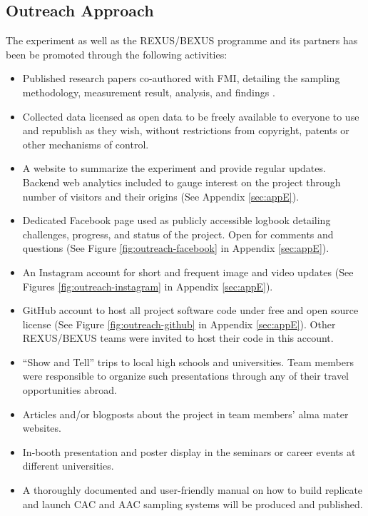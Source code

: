 
\subsection{Outreach Approach}

The experiment as well as the REXUS/BEXUS programme and its partners has been be promoted through the following activities:

\begin{itemize}
\item Published research papers co-authored with FMI, detailing the sampling methodology, measurement result, analysis, and findings \cite{esapac} \cite{labreche2020}.
\item Collected data licensed as open data to be freely available to everyone to use and republish as they wish, without restrictions from copyright, patents or other mechanisms of control.
\item A website to summarize the experiment and provide regular updates. Backend web analytics included to gauge interest on the project through number of visitors and their origins (See Appendix \ref{sec:appE}).
\item Dedicated Facebook page used as publicly accessible logbook detailing challenges, progress, and status of the project. Open for comments and questions (See Figure \ref{fig:outreach-facebook} in Appendix \ref{sec:appE}).
\item An Instagram account for short and frequent image and video updates (See Figures \ref{fig:outreach-instagram} in Appendix \ref{sec:appE}).
\item GitHub account to host all project software code under free and open source license (See Figure \ref{fig:outreach-github} in Appendix \ref{sec:appE}). Other REXUS/BEXUS teams were invited to host their code in this account.
\item\enquote{Show and Tell} trips to local high schools and universities. Team members were responsible to organize such presentations through any of their travel opportunities abroad.
\item Articles and/or blogposts about the project in team members' alma mater websites.
\item In-booth presentation and poster display in the seminars or career events at different universities. 
\item A thoroughly documented and user-friendly manual on how to build replicate and launch CAC and AAC sampling systems will be produced and published.
\end{itemize}